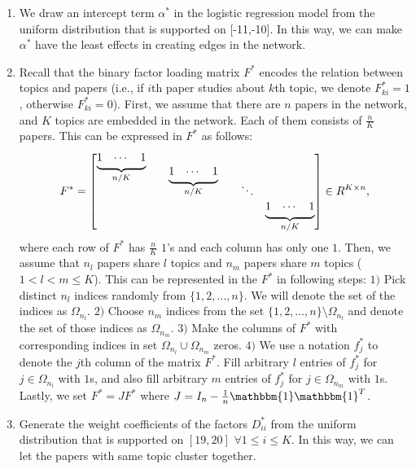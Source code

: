 \documentclass[AMS,STIX1COL]{WileyNJD-v2}
\newcommand{\block}[1]{
  \underbrace{\begin{matrix}1 & \cdots & 1\end{matrix}}_{#1}
}
\begin{document}
{\begin{enumerate}
    \item We draw an intercept term $\alpha^*$ in the logistic regression model from the uniform distribution that is supported on [-11,-10].
        In this way, we can make $\alpha^*$ have the least effects in creating edges in the network.

    \item Recall that the binary factor loading matrix $F^*$ encodes the relation between topics and papers
        (i.e., if $i$th paper studies about $k$th topic, we denote $F^*_{ki}=1$, otherwise $F^*_{ki}=0$).
        First, we assume that there are $n$ papers in the network, and $K$ topics are embedded in the network. Each of them consists of $\frac{n}{K}$ papers.
        This can be expressed in $F^*$ as follows:
        \[
            F^* =
               \begin{bmatrix}
                 \smash[b]{\block{n/K}} \\
                 && \smash[b]{\block{n/K}} \\
                 &&&& \ddots \\
                 &&&&& \block{n/K}
                \end{bmatrix}
              \in R^{K \times n},
        \]
        where each row of $F^*$ has $\frac{n}{K}$ $1$'s and each column has only one $1$.
        Then, we assume that $n_{l}$ papers share $l$ topics and $n_{m}$ papers share $m$ topics ($1 < l < m \leq K$).
        This can be represented in the $F^*$ in following steps:
        $1)$ Pick distinct $n_{l}$ indices randomly from $\{1,2,\dots,n\}$.
        We will denote the set of the indices as $\Omega_{n_l}$.
        $2)$ Choose $n_{m}$ indices from the set $\{1,2,\dots,n\}\setminus \Omega_{n_{l}}$ and denote the set of those indices as $\Omega_{n_{m}}$.
        $3)$ Make the columns of $F^*$ with corresponding indices in set $\Omega_{n_{l}} \cup \Omega_{n_{m}}$ zeros.
        $4)$ We use a notation $f^*_j$ to denote the $j$th column of the matrix $F^*$.
        Fill arbitrary $l$ entries of $f^*_j$ for $j \in \Omega_{n_l}$ with $1$s, and also fill arbitrary $m$ entries of $f^*_j$ for $j \in \Omega_{n_m}$ with $1$s.
        Lastly, we set $F^*=JF^*$ where $J=I_{n}-\frac{1}{n}\mathbbm{1}\mathbbm{1}^T$.

    \item Generate the weight coefficients of the factors $D^*_{ii}$ from the uniform distribution that is supported on $[19,20]$ $ \forall 1 \leq i \leq K$.
        In this way, we can let the papers with same topic cluster together.


\end{enumerate}}
\end{document}
